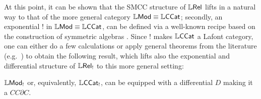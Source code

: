 \documentclass[submission,%
]{eptcs}
\begin{document}
At this point, it can be shown that the SMCC structure of $\mathbb{L} \mathsf{Rel}$ lifts in a natural way to that of the more general category $\mathbb{L}\mathsf{Mod}\equiv\mathbb{L}\mathsf{CCat}$; secondly, an exponential $!$ in $\mathbb{L}\mathsf{Mod}\equiv\mathbb{L}\mathsf{CCat}$, can be defined via a well-known recipe  based on the construction of symmetric algebras \cite{Mellies2018, Manzo2013, Laird2020} .
Since $!$ makes $\mathbb{L}\mathsf{CCat}$ a Lafont category, one can either do a few calculations or apply general theorems from the literature (e.g.~\cite{LemayCALCO2021}) to obtain the following result, which lifts also the exponential and differential structure of $\mathbb{L} \mathsf{Rel}_{!}$ to this more general setting:
%
\begin{theorem}\label{thm:no-base}
$\mathbb{L}\mathsf{Mod}_{!}$ or, equivalently, $\mathbb{L}\mathsf{CCat}_{!}$, can be equipped with a differential $D$ making it a $CC\partial C$. 
\end{theorem}



\end{document}
